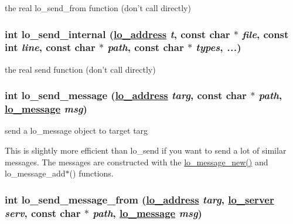 the real lo\_\-send\_\-from function (don't call directly) 

\hypertarget{group__liblolowlevel_ga7dc23a688fb08e2af1f5b981d7b0798}{
\subsubsection[lo\_\-send\_\-internal]{\setlength{\rightskip}{0pt plus 5cm}int lo\_\-send\_\-internal (\hyperlink{lo__types_8h_bf9b53223467de596b89e1377b0f3f3d}{lo\_\-address} {\em t}, const char $\ast$ {\em file}, const int {\em line}, const char $\ast$ {\em path}, const char $\ast$ {\em types},  {\em ...})}}
\label{group__liblolowlevel_ga7dc23a688fb08e2af1f5b981d7b0798}


the real send function (don't call directly) 

\hypertarget{group__liblolowlevel_g175a13c6d81adf5c346cdca9bbdcf225}{
\subsubsection[lo\_\-send\_\-message]{\setlength{\rightskip}{0pt plus 5cm}int lo\_\-send\_\-message (\hyperlink{lo__types_8h_bf9b53223467de596b89e1377b0f3f3d}{lo\_\-address} {\em targ}, const char $\ast$ {\em path}, \hyperlink{lo__types_8h_d126083c98d941f00eb72d1690b38d63}{lo\_\-message} {\em msg})}}
\label{group__liblolowlevel_g175a13c6d81adf5c346cdca9bbdcf225}


send a lo\_\-message object to target targ 

This is slightly more efficient than lo\_\-send if you want to send a lot of similar messages. The messages are constructed with the \hyperlink{group__liblolowlevel_g2cce2e97452e3e9d6b5d3af33bb1d153}{lo\_\-message\_\-new()} and lo\_\-message\_\-add$\ast$() functions. \hypertarget{group__liblolowlevel_g9d1aa7c1ee1ce60fe0cf7e3f1e5a6822}{
\subsubsection[lo\_\-send\_\-message\_\-from]{\setlength{\rightskip}{0pt plus 5cm}int lo\_\-send\_\-message\_\-from (\hyperlink{lo__types_8h_bf9b53223467de596b89e1377b0f3f3d}{lo\_\-address} {\em targ}, \hyperlink{lo__types_8h_59067bf50cf8abb4371da6f03c9036c9}{lo\_\-server} {\em serv}, const char $\ast$ {\em path}, \hyperlink{lo__types_8h_d126083c98d941f00eb72d1690b38d63}{lo\_\-message} {\em msg})}}
\label{group__liblolowlevel_g9d1aa7c1ee1ce60fe0cf7e3f1e5a6822}


